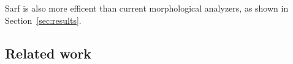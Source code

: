 \documentclass[11pt]{article}
\begin{document}
Sarf is also more efficent than current morphological analyzers, 
as shown in Section~\ref{sec:results}.






\subsection{Related work }
\label{sec:related}
\end{document}

